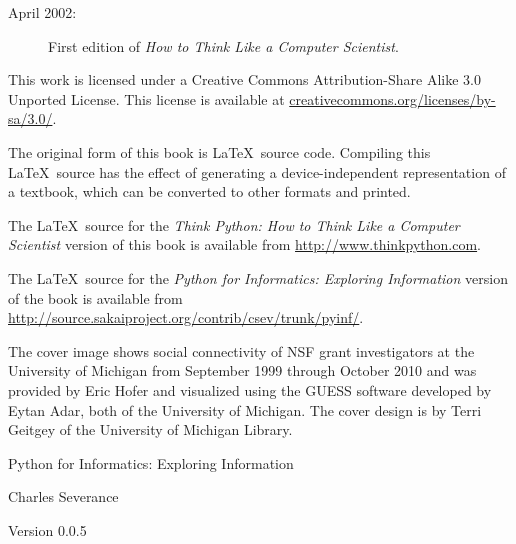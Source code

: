 \documentclass[10pt]{book}
\newcommand{\thetitle}{Python for Informatics: Exploring Information}
\newcommand{\theversion}{0.0.5}
\begin{document}
\begin{latexonly}
{\begin{description}
\item[April 2002:] First edition of \emph{How to Think Like
a Computer Scientist}.

\end{description}

\vspace{0.2in}


This work is licensed under a 
Creative Commons Attribution-Share Alike 3.0 Unported License.  This license is 
available at
\url{creativecommons.org/licenses/by-sa/3.0/}.

The original form of this book is \LaTeX\ source code.  Compiling this
\LaTeX\ source has the effect of generating a device-independent
representation of a textbook, which can be converted to other formats
and printed.

The \LaTeX\ source for the 
\emph{Think Python: How to Think Like
a Computer Scientist}
version of this book is available from
\url{http://www.thinkpython.com}.

The \LaTeX\ source for the 
\emph{Python for Informatics: Exploring Information}
version of the book is available from 
\url{http://source.sakaiproject.org/contrib/csev/trunk/pyinf/}.

The cover image shows social connectivity of NSF grant investigators 
at the University of Michigan
from September 1999 through October 2010 and was provided
by Eric Hofer and visualized using 
the GUESS software developed by Eytan Adar,
both of the University of Michigan.  The cover design is
by Terri Geitgey of the University of Michigan Library.
\vspace{0.2in}

} %

\end{latexonly}



\begin{htmlonly}


{\Large \thetitle}

{\large 
Charles Severance}

Version \theversion

\setcounter{chapter}{-1}

\end{htmlonly}
\end{document}
